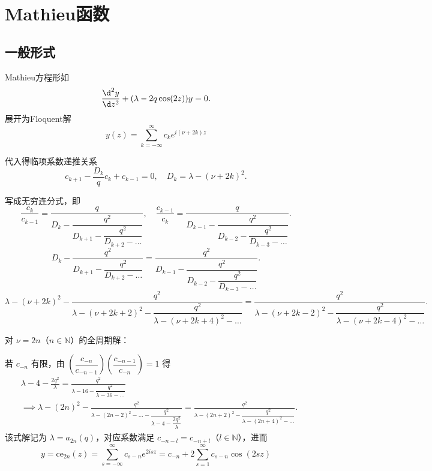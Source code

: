 \section{Mathieu函数}
\subsection{一般形式}
Mathieu方程形如
\begin{equation*}
	\frac{\d^2 y}{\d z^2} + (\lambda - 2q \cos(2z)) y = 0.
\end{equation*}
展开为Floquent解
\begin{equation*}
	y(z) = \sum_{k=-\infty}^{\infty} c_k e^{i(\nu + 2k)z}
\end{equation*}

代入得临项系数递推关系
\begin{equation*}
	c_{k+1} - \frac{D_k}{q} c_k + c_{k-1} = 0, \quad D_k = \lambda - (\nu + 2k)^2.
\end{equation*}

写成无穷连分式，即
\begin{equation*}
	\frac{c_k}{c_{k-1}} = \frac{q}{D_k - \dfrac{q^2}{D_{k+1} - \dfrac{q^2}{D_{k+2} - \dots}}}, \quad \frac{c_{k-1}}{c_k} = \frac{q}{D_{k-1} - \dfrac{q^2}{D_{k-2} - \dfrac{q^2}{D_{k-3} - \dots}}}.
\end{equation*}
\begin{equation*}
	D_k - \frac{q^2}{D_{k+1} - \dfrac{q^2}{D_{k+2} - \dots}} = \frac{q^2}{D_{k-1} - \dfrac{q^2}{D_{k-2} - \dfrac{q^2}{D_{k-3} - \dots}}}.
\end{equation*}
\begin{equation*}
	\lambda - (\nu + 2k)^2 - \frac{q^2}{\lambda - (\nu + 2k + 2)^2 - \dfrac{q^2}{\lambda - (\nu + 2k + 4)^2 - \dots}} = \frac{q^2}{\lambda - (\nu + 2k - 2)^2 - \dfrac{q^2}{\lambda - (\nu + 2k - 4)^2 - \dots}}.
\end{equation*}

对 \(\nu = 2n\)（\(n \in \mathbb{N}\)）的全周期解：

若 \(c_{-n}\) 有限，由 \(\left( \dfrac{c_{-n}}{c_{-n-1}} \right) \left( \dfrac{c_{-n-1}}{c_{-n}} \right) = 1\) 得
\begin{align*}
	 & \lambda - 4 - \frac{2q^2}{\lambda} = \frac{q^2}{\lambda - 16 - \dfrac{q^2}{\lambda - 36 - \dots}}                                                                                                       \\
	 & \implies \lambda - (2n)^2 - \frac{q^2}{\lambda - (2n - 2)^2 - \dots - \dfrac{q^2}{\lambda - 4 - \dfrac{2q^2}{\lambda}}} = \frac{q^2}{\lambda - (2n + 2)^2 - \dfrac{q^2}{\lambda - (2n + 4)^2 - \dots}}.
\end{align*}
该式解记为 \(\lambda = a_{2n}(q)\)，对应系数满足 \(c_{-n-l} = c_{-n+l}\)（\(l \in \mathbb{N}\)），进而
\begin{equation*}
	y = \mathrm{ce}_{2n}(z) = \sum_{s=-\infty}^{\infty} c_{s-n} e^{2isz} = c_{-n} + 2 \sum_{s=1}^{\infty} c_{s-n} \cos(2sz)
\end{equation*}

